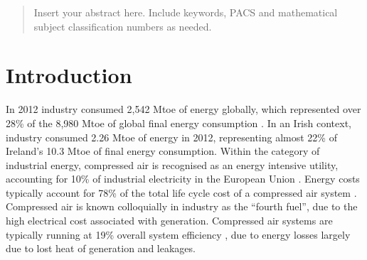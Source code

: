 

\date{Received: date / Accepted: date}


\maketitle

\begin{abstract}
Insert your abstract here. Include keywords, PACS and mathematical
subject classification numbers as needed.
\end{abstract}

\section{Introduction}
\label{intro}

In 2012 industry consumed 2,542 Mtoe of energy globally, which represented  over 28\% of the 8,980 Mtoe of global final energy consumption \cite{IEA2012}. In an Irish context, industry consumed 2.26 Mtoe of energy in 2012, representing almost 22\% of Ireland’s 10.3 Mtoe of final energy consumption. Within the category of industrial energy, compressed air is recognised as an energy intensive utility, accounting for 10\% of industrial electricity in the European Union \cite{Saidur2010}. Energy costs typically account for 78\% of the total life cycle cost of a compressed air system \cite{radgen2006efficiency}. Compressed air is known colloquially in industry as the “fourth fuel”, due to the high electrical cost associated with generation. Compressed air systems are typically running at 19\% overall system efficiency \cite{Saidur2010}, due to energy losses largely due to lost heat of generation and leakages.




